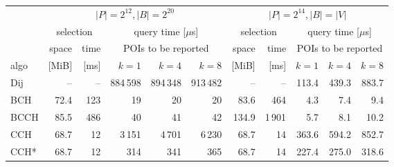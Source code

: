 \begin{tabular}{lrrrrrrrrrr}
  \toprule
  & \multicolumn{5}{c}{$|P| = 2^{12}, |B| = 2^{20}$} & \multicolumn{5}{c}{$|P| = 2^{14}, |B| = |V|$} \\
  \cmidrule(lr){2-6}\cmidrule(l){7-11}
  & \multicolumn{2}{c}{selection} & \multicolumn{3}{c}{query time [$\mu$s]} & \multicolumn{2}{c}{selection} & \multicolumn{3}{c}{query time [$\mu$s]} \\
  \cmidrule(lr){2-3}\cmidrule(lr){4-6}\cmidrule(lr){7-8}\cmidrule(l){9-11}
  & space & time & \multicolumn{3}{c}{POIs to be reported} & space & time & \multicolumn{3}{c}{POIs to be reported} \\
  algo & [MiB] & [ms] & {$k = 1$} & {$k = 4$} & {$k = 8$} & [MiB] & {[ms]} & $k = 1$ & \hspace{-\tabcolsep}$k = 4$ & \hspace{-\tabcolsep}$k = 8$ \\
  \midrule
  Dij                      &   -- &  -- & 884\,598 & 894\,348 & 913\,482 &    -- &   {--} & 113.4 & 439.3 & 883.7 \\
  BCH                      & 72.4 & 123 &       19 &       20 &       20 &  83.6 &    464 &   4.3 &   7.4 &   9.4 \\
  BCCH\hspace{-\tabcolsep} & 85.5 & 486 &       40 &       41 &       42 & 134.9 & 1\,901 &   5.7 &   8.1 &  10.2 \\
  CCH\hspace{-\tabcolsep}  & 68.7 &  12 &   3\,151 &   4\,701 &   6\,230 &  68.7 &     14 & 363.6 & 594.2 & 852.7 \\
  CCH*\hspace{-\tabcolsep} & 68.7 &  12 &      314 &      341 &      365 &  68.7 &     14 & 227.4 & 275.0 & 318.6 \\
  \bottomrule
\end{tabular}
